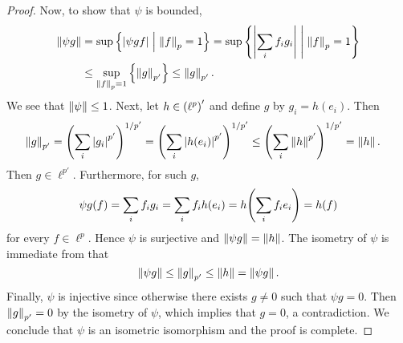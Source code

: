 \begin{proof}
    Now, to show that $\psi$ is bounded,
    \begin{equation*}
        \begin{split}
            \left\lVert {\psi g} \right\rVert &= \sup\left\{ \left\lvert {\psi gf} \right\rvert \;\middle\vert\; \left\lVert {f} \right\rVert_p = 1 \right\} 
            = \sup\left\{ \left\lvert {\sum_i f_ig_i} \right\rvert \;\middle\vert\; \left\lVert {f} \right\rVert_p = 1 \right\} \\
            &\leq \sup_{\left\lVert {f} \right\rVert_p = 1}\left\{ {\left\lVert {g} \right\rVert_{p'}} \right\} \leq \left\lVert {g} \right\rVert_{p'}.
        \end{split}
    \end{equation*}
    We see that $\left\lVert {\psi} \right\rVert\leq 1$. Next, let 
    $h\in\pth{\ell^p}'$ and define $g$ by $g_i = h(e_i)$. Then 
    \begin{equation*}
        \begin{split}
            \norm{g}_{p'} &= \pth{\sum_i \abs{g_i}^{p'}}^{1/p'} 
            = \pth{\sum_i \abs{h(e_i)}^{p'}}^{1/p'} 
            \leq \pth{\sum_i \norm{h}^{p'}}^{1/p'} 
            = \norm{h}.
        \end{split}
    \end{equation*}
    Then $g\in\ell^{p'}$. Furthermore, for such $g$,
    \begin{equation*}
        \psi g(f) = \sum_i f_ig_i = \sum_i f_ih(e_i) = h\pth{\sum_i f_ie_i} = h(f)
    \end{equation*} 
    for every $f\in\ell^p$. Hence $\psi$ is surjective and $\left\lVert {\psi g} \right\rVert 
    = \left\lVert {h} \right\rVert$. The isometry of $\psi$ is immediate from that 
    \begin{equation*}
        \left\lVert {\psi g} \right\rVert \leq \left\lVert {g} \right\rVert_{p'} \leq \left\lVert {h} \right\rVert = \left\lVert {\psi g} \right\rVert.
    \end{equation*} 
    Finally, $\psi$ is injective since otherwise there exists 
    $g\neq 0$ such that $\psi g = 0$. Then $\left\lVert {g} \right\rVert_{p'} = 0$ 
    by the isometry of $\psi$, which implies that $g = 0$, 
    a contradiction. We conclude that $\psi$ is an isometric 
    isomorphism and the proof is complete.
\end{proof}
